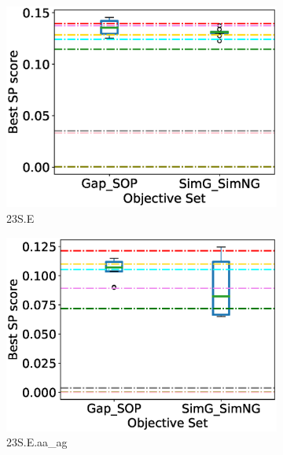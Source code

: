 \begin{figure}[!htbp]
\begin{adjustwidth}{-0.5cm}{-0.5cm}
\begin{subfigure}{0.25\textwidth}
			\includegraphics[width=\columnwidth]{Figure/summary/precomputedInit/23S.E/objset_tc_rank}
			\caption{23S.E}
		\end{subfigure}    
		\begin{subfigure}{0.25\textwidth}
			\includegraphics[width=\columnwidth]{Figure/summary/precomputedInit/23S.E.aa_ag/objset_tc_rank}
			\caption{23S.E.aa\_ag}
		\end{subfigure}
		\begin{subfigure}{0.25\textwidth}

\end{subfigure}
\end{adjustwidth}
\end{figure}

